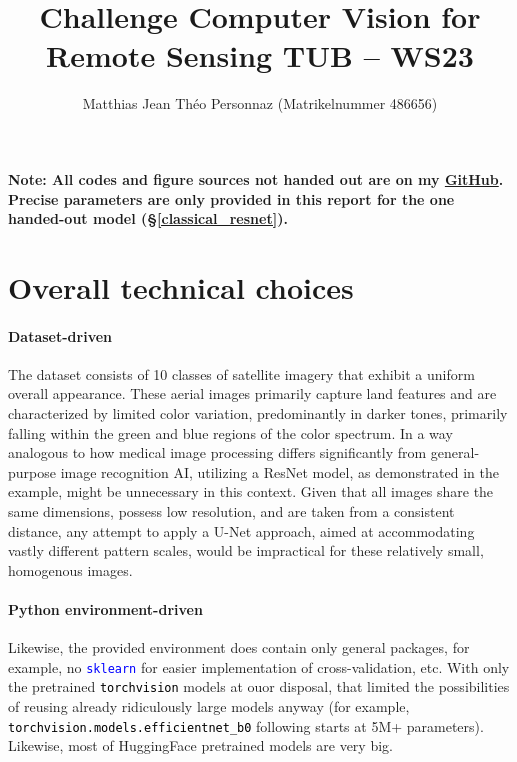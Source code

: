 \documentclass{article}
\title{Challenge Computer Vision for Remote Sensing  TUB -- WS23}
\author{Matthias Jean Théo Personnaz (Matrikelnummer 486656)}
\date{\nodate}
\newcommand{\codewordblue}[1]{\texttt{\textcolor{blue}{#1}}}
\newcommand{\codewordgreen}[1]{\texttt{\textcolor{black}{#1}}}
\begin{document}
\maketitle
\vspace{-0.5cm}
\textbf{Note: All codes and figure sources not handed out are on my  \href{https://github.com/MatthiasPersonnaz/cv4rs-code-challenge}{GitHub}. Precise  parameters are only provided in this report  for the  one handed-out model (\S \ref{classical_resnet}).}
\section{Overall technical choices}

\paragraph{Dataset-driven}

The dataset consists of 10 classes of satellite imagery that exhibit a uniform overall appearance. These aerial images primarily capture land features and are characterized by limited color variation, predominantly in darker tones, primarily falling within the green and blue regions of the color spectrum. In a way analogous to how medical image processing differs significantly from general-purpose image recognition AI, utilizing a ResNet model, as demonstrated in the example, might be unnecessary in this context. Given that all images share the same dimensions, possess low resolution, and are taken from a consistent distance, any attempt to apply a U-Net approach, aimed at accommodating vastly different pattern scales, would be impractical for these relatively small, homogenous images.

\paragraph{Python environment-driven} Likewise, the provided  environment does contain only general packages, for example, no \codewordblue{sklearn} for easier implementation of cross-validation, etc. With only the pretrained \codewordgreen{torchvision} models at ouor disposal, that limited the possibilities of reusing already ridiculously large models anyway (for example, \codewordgreen{torchvision.models.efficientnet\_b0} following \cite{Tan2019-az} starts at 5M+ parameters). Likewise, most of HuggingFace pretrained models are very big.
\end{document}
